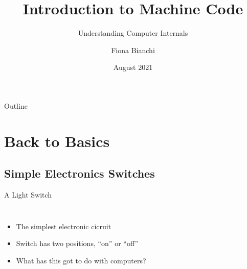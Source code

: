 \documentclass{beamer}
\title{Introduction to Machine Code}
\subtitle{Understanding Computer Internals}
\author{Fiona Bianchi}
\institute{HiKlas Ltd}
\date{August 2021}
\begin{document}
\begin{frame}
  \titlepage
\end{frame}

\begin{frame}{Outline}
  \tableofcontents
\end{frame}


\section{Back to Basics}

\subsection[Switches]{Simple Electronics Switches}

\begin{frame}{A Light Switch}

  \begin{columns}
    \begin{itemize}
    \item
      The simplest electronic cicruit
    \item
      Switch has two positions, ``on'' or ``off''
    \item
      What has this got to do with computers?
    \end{itemize}

  \end{columns}
\end{frame}
\end{document}
